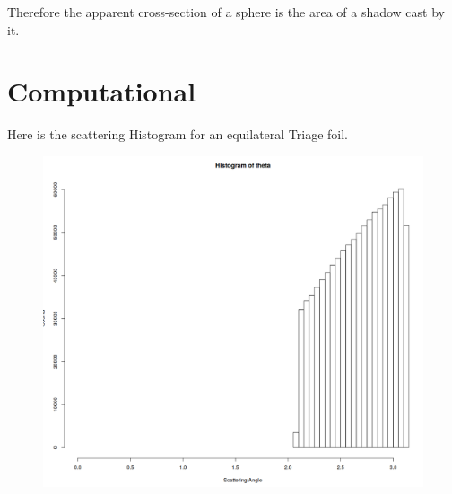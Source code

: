 \documentclass[12pt]{article}
\begin{document}
Therefore the apparent cross-section of a sphere is the area of a shadow cast by it.

\pagebreak
\section{Computational}

Here is the scattering Histogram for an equilateral Triage foil.

\begin{figure}[h]
  \centering
  \includegraphics[width=400pt]{hist.png}
  \label{fig:hist}
\end{figure}
\end{document}
